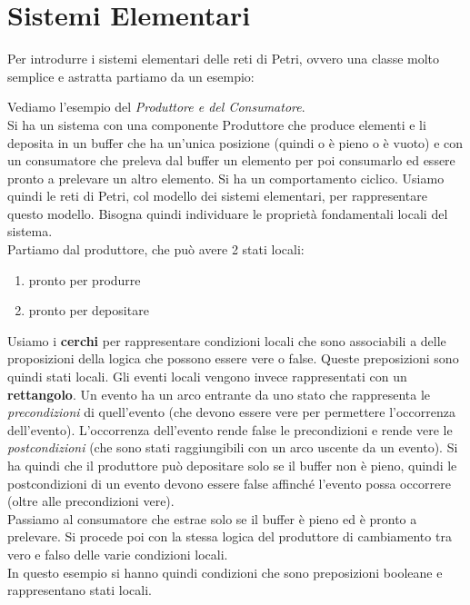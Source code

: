 \documentclass[a4paper,12pt, oneside]{book}
\begin{document}
\section{Sistemi Elementari}
Per introdurre i sistemi elementari delle reti di Petri, ovvero una classe molto
semplice e astratta partiamo da un esempio:
\begin{esempio}
  Vediamo l'esempio del \textit{Produttore e del Consumatore}.\\
  Si ha un sistema con una componente Produttore che produce elementi e li
  deposita in un buffer che ha un'unica posizione (quindi o è pieno o è vuoto) e
  con un consumatore che preleva dal buffer un elemento per poi consumarlo ed
  essere pronto a prelevare un altro elemento. Si ha un comportamento
  ciclico. Usiamo quindi le reti di Petri, col modello dei sistemi elementari,
  per rappresentare questo modello. Bisogna quindi individuare le proprietà
  fondamentali locali del sistema.\\
  Partiamo dal produttore, che può avere 2 stati locali:
  \begin{enumerate}
    \item pronto per produrre
    \item pronto per depositare
  \end{enumerate}
  Usiamo i \textbf{cerchi} per rappresentare condizioni locali che sono
  associabili a delle proposizioni della logica che possono essere vere o
  false. Queste preposizioni sono quindi stati locali. Gli eventi locali vengono
  invece rappresentati con un \textbf{rettangolo}. Un evento ha un arco entrante
  da uno stato che rappresenta le \textit{precondizioni} di quell'evento (che
  devono essere vere per permettere l'occorrenza dell'evento). L'occorrenza
  dell'evento rende false le precondizioni e rende vere le
  \textit{postcondizioni} (che sono stati raggiungibili con un arco uscente da
  un evento). Si ha quindi che il produttore può depositare solo se il buffer
  non è pieno, quindi le postcondizioni di un evento devono essere false
  affinché l'evento possa occorrere (oltre alle precondizioni vere).\\
  Passiamo al consumatore che estrae solo se il buffer è pieno ed è pronto a
  prelevare. Si procede poi con la stessa logica del produttore di cambiamento
  tra vero e falso delle varie condizioni locali.\\
  In questo esempio si hanno quindi condizioni che sono preposizioni booleane e
  rappresentano stati locali.
  \begin{figure}[H]

\end{figure}
\end{esempio}
\end{document}
